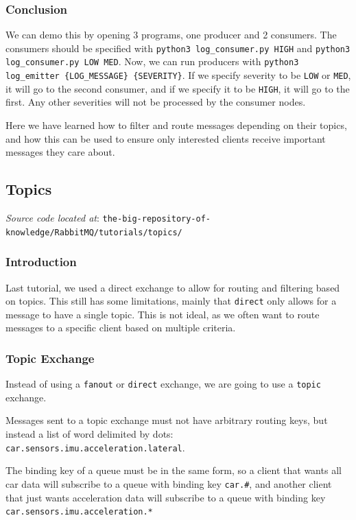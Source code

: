 \documentclass{article}
\begin{document}
\subsubsection{Conclusion}

We can demo this by opening 3 programs, one producer and 2 consumers. The consumers should be specified with \verb|python3 log_consumer.py HIGH| and \verb|python3 log_consumer.py LOW MED|. Now, we can run producers with \verb|python3 log_emitter {LOG_MESSAGE} {SEVERITY}|. If we specify severity to be \verb|LOW| or \verb|MED|, it will go to the second consumer, and if we specify it to be \verb|HIGH|, it will go to the first. Any other severities will not be processed by the consumer nodes. 

Here we have learned how to filter and route messages depending on their topics, and how this can be used to ensure only interested clients receive important messages they care about.

\subsection{Topics}

\textit{Source code located at}: \verb|the-big-repository-of-knowledge/RabbitMQ/tutorials/topics/|

\subsubsection{Introduction}

Last tutorial, we used a direct exchange to allow for routing and filtering based on topics. This still has some limitations, mainly that \verb|direct| only allows for a message to have a single topic. This is not ideal, as we often want to route messages to a specific client based on multiple criteria.

\subsubsection{Topic Exchange}

Instead of using a \verb|fanout| or \verb|direct| exchange, we are going to use a \verb|topic| exchange.

Messages sent to a topic exchange must not have arbitrary routing keys, but instead a list of word delimited by dots: \verb|car.sensors.imu.acceleration.lateral|.

The binding key of a queue must be in the same form, so a client that wants all car data will subscribe to a queue with binding key \verb|car.#|, and another client that just wants acceleration data will subscribe to a queue with binding key \verb|car.sensors.imu.acceleration.*|
\end{document}
